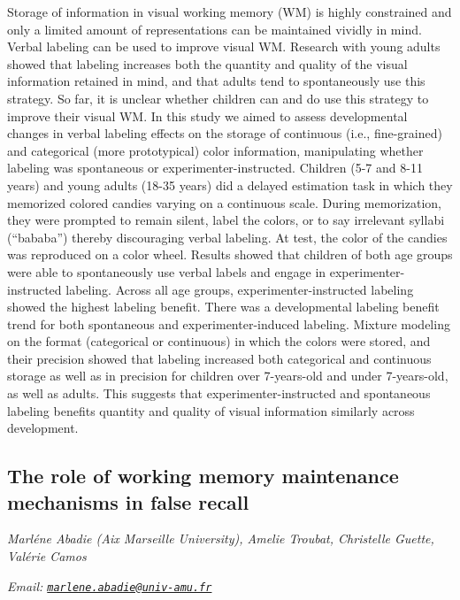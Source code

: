 \documentclass[12pt,]{book}
\begin{document}
Storage of information in visual working memory (WM) is highly constrained and only a limited amount of representations can be maintained vividly in mind. Verbal labeling can be used to improve visual WM. Research with young adults showed that labeling increases both the quantity and quality of the visual information retained in mind, and that adults tend to spontaneously use this strategy. So far, it is unclear whether children can and do use this strategy to improve their visual WM. In this study we aimed to assess developmental changes in verbal labeling effects on the storage of continuous (i.e., fine-grained) and categorical (more prototypical) color information, manipulating whether labeling was spontaneous or experimenter-instructed. Children (5-7 and 8-11 years) and young adults (18-35 years) did a delayed estimation task in which they memorized colored candies varying on a continuous scale. During memorization, they were prompted to remain silent, label the colors, or to say irrelevant syllabi (``bababa'') thereby discouraging verbal labeling. At test, the color of the candies was reproduced on a color wheel. Results showed that children of both age groups were able to spontaneously use verbal labels and engage in experimenter-instructed labeling. Across all age groups, experimenter-instructed labeling showed the highest labeling benefit. There was a developmental labeling benefit trend for both spontaneous and experimenter-induced labeling. Mixture modeling on the format (categorical or continuous) in which the colors were stored, and their precision showed that labeling increased both categorical and continuous storage as well as in precision for children over 7-years-old and under 7-years-old, as well as adults. This suggests that experimenter-instructed and spontaneous labeling benefits quantity and quality of visual information similarly across development.

\hypertarget{the-role-of-working-memory-maintenance-mechanisms-in-false-recall}{%
\subsection{The role of working memory maintenance mechanisms in false recall}\label{the-role-of-working-memory-maintenance-mechanisms-in-false-recall}}

\emph{Marléne Abadie (Aix Marseille University), Amelie Troubat, Christelle Guette, Valérie Camos}

\emph{Email: \href{mailto:marlene.abadie@univ-amu.fr}{\nolinkurl{marlene.abadie@univ-amu.fr}}}
\end{document}

